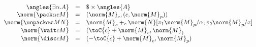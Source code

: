 \begin{small}
  \[
  \begin{array}{rcl}
\angles{\exists \alpha. A} & = & \$ \times \angles{A}\\
\norm{\pack \alpha c M} & = & (\norm{M}_c,(c,\norm{M}_p))\\
\norm{\unpack \alpha x M N}  &= & \norm{M}_c +_c \norm{N}[\pi_1\norm{M}_p/\alpha,\pi_2\norm{M}_p/x]\\
\norm{\wait c M} & = & (\toC{c} + \norm{M}_c,\norm{M}_)\\
\norm{\disc c M} & = & (-\toC{c} + \norm{M}_c,\norm{M}_p)\\
  \end{array}
  \]
\end{small}
